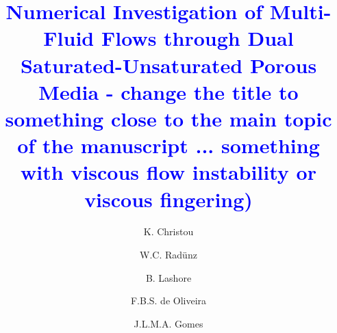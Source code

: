 \documentclass[preprint,authoryear,12pt]{elsarticle}
\newcommand{\blue}{\textcolor{blue}}
\begin{document}
\begin{frontmatter}



\title{ \blue{Numerical Investigation of Multi-Fluid Flows through Dual Saturated-Unsaturated Porous Media - change the title to something close to the main topic of the manuscript ... something with viscous flow instability or viscous fingering)}}

\author[UoA]{K. Christou} \author[UoA,UFRGS]{W.C. Rad\"unz}  \author[UoA]{B. Lashore} \author[UESC]{F.B.S. de Oliveira}
\author[UoA]{J.L.M.A. Gomes}

\address[UoA]{Environmental and Industrial Fluid Mechanics Group, School of Engineering, University of Aberdeen, UK}
\address[UFRGS]{Engineering School, Federal University of Rio Grande do Sul, Brazil}
\address[UESC]{Department of Exact and Technological Sciences, State University of Santa Cruz, Bahia, Brazil}


\end{frontmatter}
\end{document}
